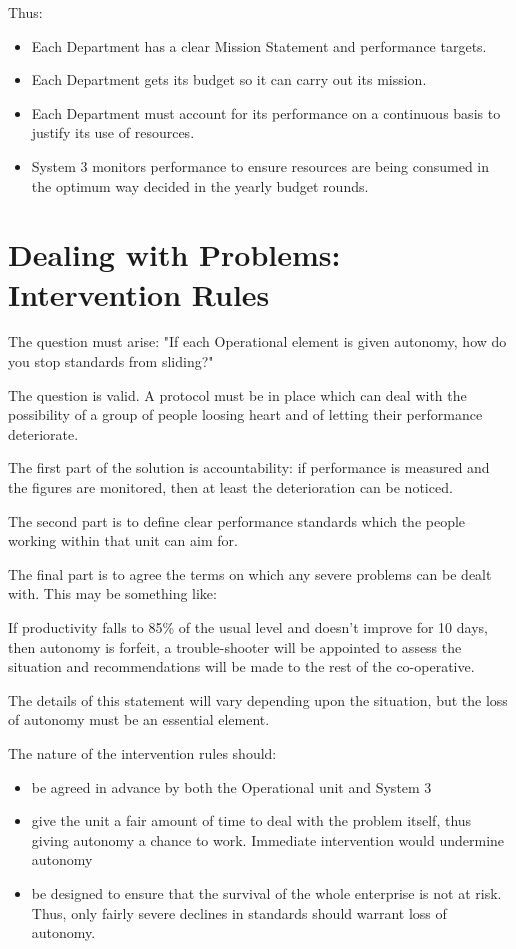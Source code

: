 Thus:

\begin{itemize}
  \item Each Department has a clear Mission Statement and performance targets.

  \item Each Department gets its budget so it can carry out its mission.

  \item Each Department must account for its performance on a continuous basis to justify its use of resources.

  \item System 3 monitors performance to ensure resources are being consumed in the optimum way decided in the yearly budget rounds.

\end{itemize}

\section*{Dealing with Problems: Intervention Rules}
The question must arise: "If each Operational element is given autonomy, how do you stop standards from sliding?"

The question is valid. A protocol must be in place which can deal with the possibility of a group of people loosing heart and of letting their performance deteriorate.

The first part of the solution is accountability: if performance is measured and the figures are monitored, then at least the deterioration can be noticed.

The second part is to define clear performance standards which the people working within that unit can aim for.

The final part is to agree the terms on which any severe problems can be dealt with. This may be something like:

If productivity falls to 85\% of the usual level and doesn't improve for 10 days, then autonomy is forfeit, a trouble-shooter will be appointed to assess the situation and recommendations will be made to the rest of the co-operative.

The details of this statement will vary depending upon the situation, but the loss of autonomy must be an essential element.

The nature of the intervention rules should:

\begin{itemize}
  \item be agreed in advance by both the Operational unit and System 3

  \item give the unit a fair amount of time to deal with the problem itself, thus giving autonomy a chance to work. Immediate intervention would undermine autonomy

  \item be designed to ensure that the survival of the whole enterprise is not at risk. Thus, only fairly severe declines in standards should warrant loss of autonomy.

\end{itemize}

